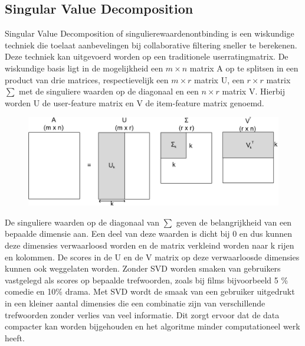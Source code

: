 \subsection{Singular Value Decomposition}
Singular Value Decomposition of singulierewaardenontbinding is een wiskundige techniek die toelaat aanbevelingen bij  collaborative filtering sneller te berekenen. Deze techniek kan uitgevoerd worden op een traditionele userratingmatrix. De wiskundige basis ligt in de mogelijkheid een $m \times n$ matrix A op te splitsen in een product van drie matrices, respectievelijk een $m \times r$ matrix U, een $r \times r$ matrix $\sum$ met de singuliere waarden op de diagonaal en een $n \times r$ matrix V. Hierbij worden U de user-feature matrix en V de item-feature matrix genoemd.

\begin{figure}[htpb]   
    \label{Figuur::svd}      
  \begin{center}    
 \includegraphics[scale=0.3]{fig/svd}    
  \end{center}   
    
   \end{figure}

 De singuliere waarden op de diagonaal van $\sum$ geven de belangrijkheid van een bepaalde dimensie aan. Een deel van deze waarden is dicht bij 0 en dus kunnen deze  dimensies verwaarloosd worden en de matrix verkleind worden naar k rijen en kolommen. De scores in de U en de V matrix op deze verwaarloosde dimensies kunnen ook weggelaten worden. 
 Zonder SVD worden smaken van gebruikers vastgelegd als scores op bepaalde trefwoorden, zoals bij films bijvoorbeeld 5 \% comedie en 10\% drama. Met SVD wordt de smaak van een gebruiker uitgedrukt in een kleiner aantal dimensies die een combinatie zijn van verschillende trefwoorden zonder verlies van veel informatie. Dit zorgt ervoor dat de data compacter kan worden bijgehouden en het algoritme minder computationeel werk heeft. 


